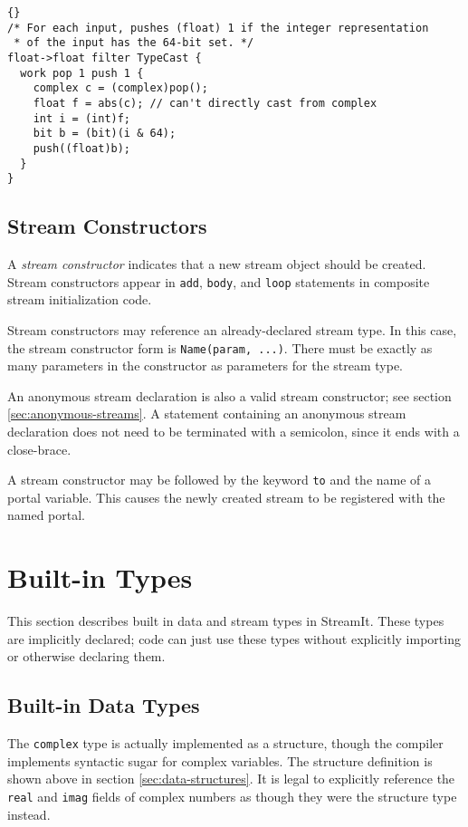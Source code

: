 \documentclass[11pt]{article}
\begin{document}
\begin{lstlisting}{}
/* For each input, pushes (float) 1 if the integer representation
 * of the input has the 64-bit set. */
float->float filter TypeCast {
  work pop 1 push 1 {
    complex c = (complex)pop();
    float f = abs(c); // can't directly cast from complex
    int i = (int)f;
    bit b = (bit)(i & 64);
    push((float)b);
  }
}
\end{lstlisting}

\subsection{Stream Constructors}
\label{sec:expr-stream-constructor}

A \emph{stream constructor} indicates that a new stream object should
be created.  Stream constructors appear in \lstinline|add|,
\lstinline|body|, and \lstinline|loop| statements in composite stream
initialization code.

Stream constructors may reference an already-declared stream type.  In
this case, the stream constructor form is \lstinline|Name(param, ...)|.
There must be exactly as many parameters in the constructor as
parameters for the stream type.  

An anonymous stream declaration is also a valid stream constructor;
see section \ref{sec:anonymous-streams}.  A statement containing an
anonymous stream declaration does not need to be terminated with a
semicolon, since it ends with a close-brace.

A stream constructor may be followed by the keyword \lstinline|to| and
the name of a portal variable.  This causes the newly created stream
to be registered with the named portal.

\section{Built-in Types}

This section describes built in data and stream types in StreamIt.
These types are implicitly declared; code can just use these types
without explicitly importing or otherwise declaring them.

\subsection{Built-in Data Types}

The \lstinline|complex| type is actually implemented as a structure,
though the compiler implements syntactic sugar for complex variables.
The structure definition is shown above in section
\ref{sec:data-structures}.
It is legal to explicitly reference the \lstinline|real| and
\lstinline|imag| fields of complex numbers as though they were the
structure type instead.
\end{document}
